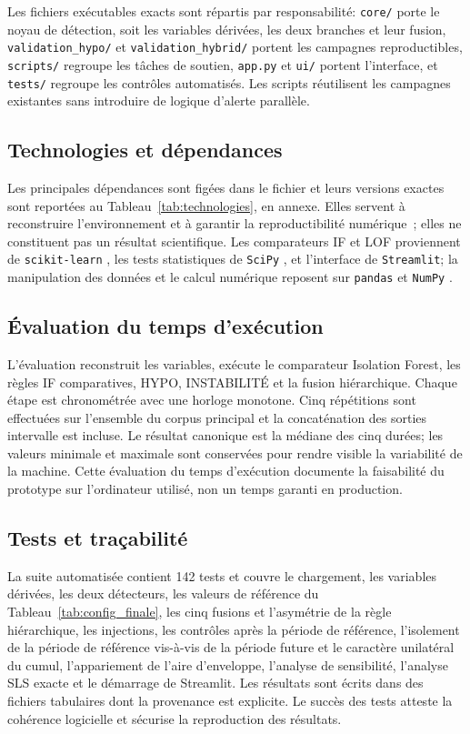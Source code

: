 Les fichiers exécutables exacts sont répartis par responsabilité: \texttt{core/} porte le
noyau de détection, soit les variables dérivées, les deux branches et leur
fusion, \texttt{validation\_hypo/} et \texttt{validation\_hybrid/} portent les
campagnes reproductibles, \texttt{scripts/} regroupe les tâches de soutien, \texttt{app.py}
et \texttt{ui/} portent l'interface, et \texttt{tests/} regroupe les contrôles automatisés.
Les scripts réutilisent les campagnes existantes sans introduire de logique d'alerte
parallèle.

\subsection{Technologies et dépendances}
Les principales dépendances sont figées dans le fichier  et leurs
versions exactes sont reportées au Tableau~\ref{tab:technologies}, en annexe. Elles servent à
reconstruire l'environnement et à garantir la reproductibilité numérique~; elles ne constituent
pas un résultat scientifique.
Les comparateurs IF et LOF proviennent de \texttt{scikit-learn}
\citep{sklearn_api}, les tests statistiques de \texttt{SciPy} \citep{virtanen2020scipy},
et l'interface de \texttt{Streamlit}; la manipulation des données et le calcul numérique
reposent sur \texttt{pandas} \citep{mckinney2010data} et \texttt{NumPy} \citep{harris2020array}.


\subsection{Évaluation du temps d'exécution}
L'évaluation reconstruit les variables, exécute le comparateur Isolation Forest, les règles
IF comparatives, HYPO, INSTABILITÉ et la fusion hiérarchique. Chaque étape est chronométrée avec
une horloge monotone. Cinq répétitions sont effectuées sur l'ensemble du corpus principal et la concaténation
des sorties intervalle est incluse. Le résultat canonique est la médiane des cinq durées; les
valeurs minimale et maximale sont conservées pour rendre visible la variabilité de la machine.
Cette évaluation du temps d'exécution documente la faisabilité du prototype sur l'ordinateur
utilisé, non un temps garanti en production.

\subsection{Tests et traçabilité}
La suite automatisée contient 142 tests et couvre le chargement, les variables dérivées,
les deux détecteurs, les valeurs de référence du Tableau~\ref{tab:config_finale}, les cinq fusions
et l'asymétrie de la règle hiérarchique, les injections, les contrôles après la période de référence,
l'isolement de la période de référence vis-à-vis de la période future et le caractère unilatéral du cumul,
l'appariement de l'aire d'enveloppe, l'analyse de sensibilité, l'analyse SLS exacte et le démarrage de
Streamlit. Les résultats sont
écrits dans des fichiers tabulaires dont la provenance est explicite. Le succès des tests
atteste la cohérence logicielle et sécurise la reproduction des résultats.

